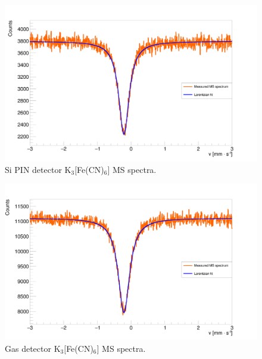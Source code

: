 \begin{figure}[H]
\centering
\includegraphics[scale=0.125, angle = 0]{./pictures/MossSemi.png}
\caption{Si PIN detector K$_{3}[$Fe(CN)$_{6}]$ MS spectra.}
\label{Si PIN detector MS spectra.}

\end{figure}

\begin{figure}[H]
\centering
\includegraphics[scale=0.125, angle = 0]{./pictures/MossGas.png}
\caption{Gas detector K$_{3}[$Fe(CN)$_{6}]$ MS spectra.}
\label{Gas detector MS spectra.}

\end{figure}

